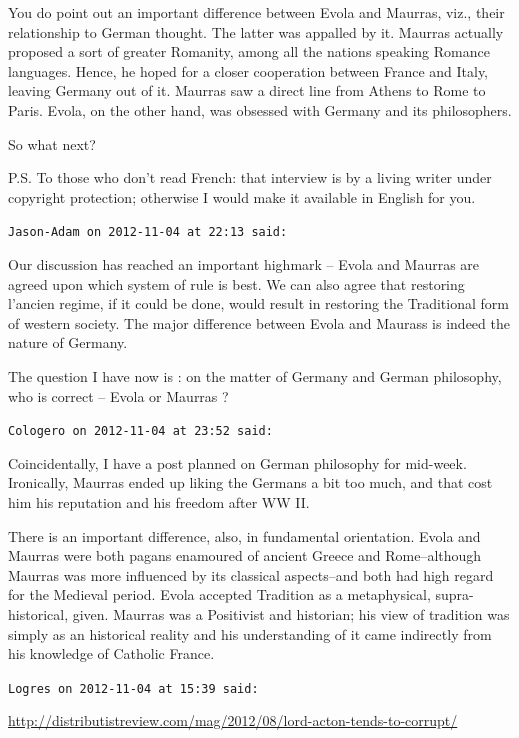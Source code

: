 \begin{footnotesize}
\begin{sffamily}
You do point out an important difference between Evola and Maurras, viz., their relationship to German thought. The latter was appalled by it. Maurras actually proposed a sort of greater Romanity, among all the nations speaking Romance languages. Hence, he hoped for a closer cooperation between France and Italy, leaving Germany out of it. Maurras saw a direct line from Athens to Rome to Paris. Evola, on the other hand, was obsessed with Germany and its philosophers.

So what next?

P.S. To those who don't read French: that interview is by a living writer under copyright protection; otherwise I would make it available in English for you.


\hfill

\texttt{Jason-Adam on 2012-11-04 at 22:13 said: }

Our discussion has reached an important highmark – Evola and Maurras are agreed upon which system of rule is best. We can also agree that restoring l'ancien regime, if it could be done, would result in restoring the Traditional form of western society. The major difference between Evola and Maurass is indeed the nature of Germany.

The question I have now is : on the matter of Germany and German philosophy, who is correct – Evola or Maurras ?


\hfill

\texttt{Cologero on 2012-11-04 at 23:52 said: }

Coincidentally, I have a post planned on German philosophy for mid-week. Ironically, Maurras ended up liking the Germans a bit too much, and that cost him his reputation and his freedom after WW II.

There is an important difference, also, in fundamental orientation. Evola and Maurras were both pagans enamoured of ancient Greece and Rome–although Maurras was more influenced by its classical aspects–and both had high regard for the Medieval period. Evola accepted Tradition as a metaphysical, supra-historical, given. Maurras was a Positivist and historian; his view of tradition was simply as an historical reality and his understanding of it came indirectly from his knowledge of Catholic France.


\hfill

\texttt{Logres on 2012-11-04 at 15:39 said: }

\url{http://distributistreview.com/mag/2012/08/lord-acton-tends-to-corrupt/}


\end{sffamily}
\end{footnotesize}
